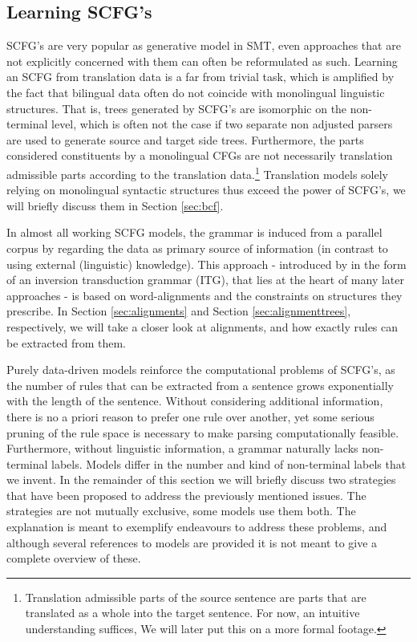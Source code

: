 \documentclass{report}
\theoremstyle{definition}
\theoremstyle{plain}
\begin{document}


\subsection{Learning SCFG's}
\label{subsec:learningSCFGs}

SCFG's are very popular as generative model in SMT, even approaches that are not explicitly concerned with them can often be reformulated as such. Learning an SCFG from translation data is a far from trivial task, which is amplified by the fact that bilingual data often do not coincide with monolingual linguistic structures. That is, trees generated by SCFG's are isomorphic on the non-terminal level, which is often not the case if two separate non adjusted parsers are used to generate source and target side trees. Furthermore, the parts considered constituents by a monolingual CFGs are not necessarily translation admissible parts according to the translation data.\footnote{Translation admissible parts of the source sentence are parts that are translated as a whole into the target sentence. For now, an intuitive understanding suffices, We will later put this on a more formal footage.} Translation models solely relying on monolingual syntactic structures thus exceed the power of SCFG's, we will briefly discuss them in Section \ref{sec:bcf}.

In almost all working SCFG models, the grammar is induced from a parallel corpus by regarding the data as primary source of information (in contrast to using external (linguistic) knowledge). This approach - introduced by \cite{wu1995algorithm} in the form of an inversion transduction grammar (ITG), that lies at the heart of many later approaches - is based on word-alignments and the constraints on structures they prescribe. In Section \ref{sec:alignments} and Section \ref{sec:alignmenttrees}, respectively, we will take a closer look at alignments, and how exactly rules can be extracted from them.

Purely data-driven models reinforce the computational problems of SCFG's, as the number of rules that can be extracted from a sentence grows exponentially with the length of the sentence\citep{quirk2006dependency}. Without considering additional information, there is no a priori reason to prefer one rule over another, yet some serious pruning of the rule space is necessary to make parsing computationally feasible. Furthermore, without linguistic information, a grammar naturally lacks non-terminal labels. Models differ in the number and kind of non-terminal labels that we invent. In the remainder of this section we will briefly discuss two strategies that have been proposed to address the previously mentioned issues. The strategies are not mutually exclusive, some models use them both. The explanation is meant to exemplify endeavours to address these problems, and although several references to models are provided it is not meant to give a complete overview of these.
\end{document}
